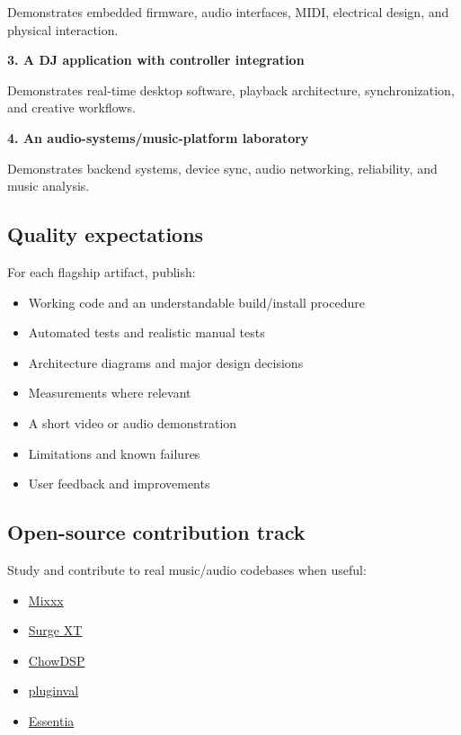 \documentclass[11pt,letterpaper]{article}
\begin{document}
Demonstrates embedded firmware, audio interfaces, MIDI, electrical design, and physical interaction.

\textbf{3. A DJ application with controller integration}

Demonstrates real-time desktop software, playback architecture, synchronization, and creative workflows.

\textbf{4. An audio-systems/music-platform laboratory}

Demonstrates backend systems, device sync, audio networking, reliability, and music analysis.

\subsection*{Quality expectations}\label{quality-expectations}

For each flagship artifact, publish:

\begin{itemize}
\item Working code and an understandable build/install procedure
\item Automated tests and realistic manual tests
\item Architecture diagrams and major design decisions
\item Measurements where relevant
\item A short video or audio demonstration
\item Limitations and known failures
\item User feedback and improvements
\end{itemize}

\clearpage
\subsection*{Open-source contribution track}\label{open-source-contribution-track}

Study and contribute to real music/audio codebases when useful:

\begin{itemize}
\item \href{https://github.com/mixxxdj/mixxx}{Mixxx}
\item \href{https://github.com/surge-synthesizer/surge}{Surge XT}
\item \href{https://github.com/Chowdhury-DSP}{ChowDSP}
\item \href{https://github.com/Tracktion/pluginval}{pluginval}
\item \href{https://github.com/MTG/essentia}{Essentia}
\end{itemize}
\end{document}
